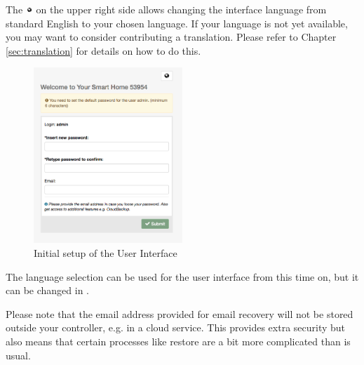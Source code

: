 \vspace{5mm}
\noindent{}
\vspace{5mm}


The  \includegraphics[width=0.02\textwidth]{pngs/world.png} on the upper right side 
allows changing the interface language from 
standard English to your chosen language. If your language is not yet available, you 
may want to consider contributing a translation. Please refer to Chapter \ref{sec:translation} 
for details on how to do this.

\begin{figure}
\begin{center}
\includegraphics[width=0.5\textwidth]{pngs/cap3/init1.png}
\caption{Initial setup of the \zway User Interface}
\label{init1}
\end{center}
\end{figure}

The language selection can be used for the user interface from this time on, but it can 
be changed in .

Please note that the email address provided for email recovery will not be stored outside 
your controller, e.g. in a cloud service. This provides extra security but also means that 
certain processes like restore are a bit more complicated than is usual.

